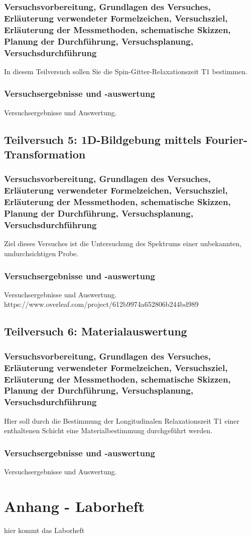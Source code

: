 \documentclass[12pt,oneside,oldfontcommands]{memoir}
\begin{document}
\subsubsection{Versuchsvorbereitung, Grundlagen des Versuches, Erläuterung verwendeter Formelzeichen, Versuchsziel, Erläuterung der Messmethoden, schematische Skizzen, Planung der Durchführung, Versuchsplanung, Versuchsdurchführung}
In diesem Teilversuch sollen Sie die Spin-Gitter-Relaxationszeit T1 bestimmen.

\subsubsection{Versuchsergebnisse und -auswertung}
Versuchsergebnisse und Auswertung.

\subsection{Teilversuch 5: 1D-Bildgebung mittels Fourier-Transformation}
\subsubsection{Versuchsvorbereitung, Grundlagen des Versuches, Erläuterung verwendeter Formelzeichen, Versuchsziel, Erläuterung der Messmethoden, schematische Skizzen, Planung der Durchführung, Versuchsplanung, Versuchsdurchführung}
Ziel dieses Versuches ist die Untersuchung des Spektrums einer unbekannten, undurchsichtigen Probe. 

\subsubsection{Versuchsergebnisse und -auswertung}
Versuchsergebnisse und Auswertung.
https://www.overleaf.com/project/612b9974a652806b244bd989
\subsection{Teilversuch 6: Materialauswertung}
\subsubsection{Versuchsvorbereitung, Grundlagen des Versuches, Erläuterung verwendeter Formelzeichen, Versuchsziel, Erläuterung der Messmethoden, schematische Skizzen, Planung der Durchführung, Versuchsplanung, Versuchsdurchführung}
Hier soll durch die Bestimmung der Longitudinalen Relaxationszeit T1 einer enthaltenen Schicht eine Materialbestimmung durchgeführt werden. 

\subsubsection{Versuchsergebnisse und -auswertung}
Versuchsergebnisse und Auswertung.


\section{Anhang - Laborheft}
%
hier kommt das Laborheft
\end{document}
